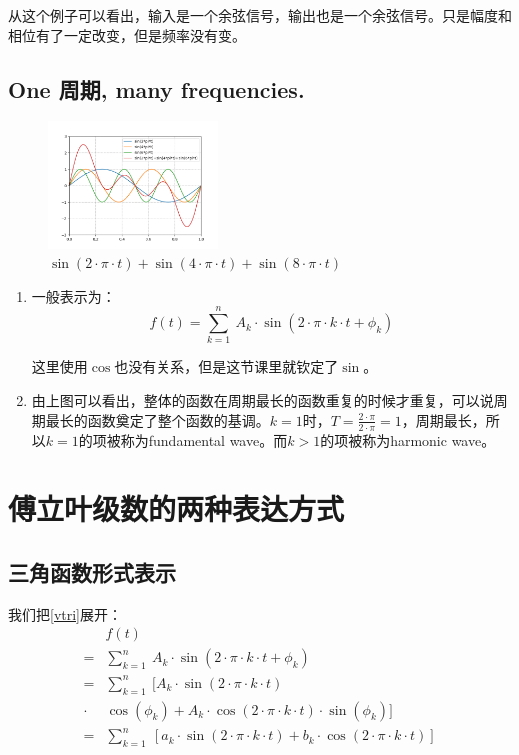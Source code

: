 从这个例子可以看出，输入是一个余弦信号，输出也是一个余弦信号。只是幅度和相位有了一定改变，但是频率没有变。
\subsection{One 周期, many frequencies.}
\begin{figure}[H]
	\centering
	\includegraphics[width=0.4\textwidth]{assets/Figure_1.png}
	\caption{$\sin(2\cdot\pi\cdot t)+\sin(4\cdot\pi\cdot t)+\sin(8\cdot\pi\cdot t)$}
\end{figure}
\begin{enumerate}
	\item 一般表示为：
	      \begin{equation}\label{vtri}
		      f(t)=\sum\limits_{k=1}^n\ A_k\cdot \sin(2\cdot \pi\cdot k\cdot t+\phi_k)
	      \end{equation}

	      这里使用$\cos$也没有关系，但是这节课里就钦定了$\sin$。
	\item 由上图可以看出，整体的函数在周期最长的函数重复的时候才重复，可以说周期最长的函数奠定了整个函数的基调。$k=1​$时，$T=\frac{2\cdot \pi}{2\cdot \pi}=1​$，周期最长，所以$k=1​$的项被称为fundamental wave。而$k>1​$的项被称为harmonic wave。
\end{enumerate}

\section{傅立叶级数的两种表达方式}
\subsection{三角函数形式表示}
我们把\ref{vtri}展开：
\begin{align*}
	      & f(t)                                                                                                   \\
	=     & \sum\limits_{k=1}^n\ A_k\cdot \sin(2\cdot\pi\cdot k\cdot t+\phi_k)                                     \\
	=     & \sum\limits_{k=1}^n\ [A_k\cdot \sin(2\cdot\pi\cdot k\cdot t)                                           \\
	\cdot & \cos(\phi_k)+A_k\cdot \cos(2\cdot \pi\cdot k\cdot t)\cdot \sin(\phi_k)]                                \\
	=     & \sum\limits_{k=1}^n\ [a_k\cdot \sin(2\cdot\pi\cdot k\cdot t) +b_k\cdot \cos(2\cdot \pi\cdot k\cdot t)]
\end{align*}

